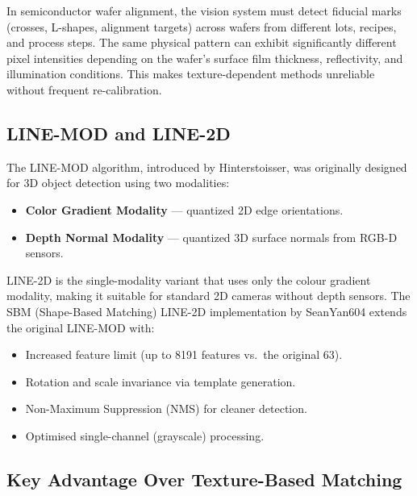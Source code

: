 \documentclass[12pt,a4paper]{article}
\begin{document}
In semiconductor wafer alignment, the vision system must detect fiducial marks
(crosses, L-shapes, alignment targets) across wafers from different lots, recipes,
and process steps.  The same physical pattern can exhibit significantly different
pixel intensities depending on the wafer's surface film thickness, reflectivity, and
illumination conditions.  This makes texture-dependent methods unreliable without
frequent re-calibration.

\subsection{LINE-MOD and LINE-2D}
The LINE-MOD algorithm, introduced by Hinterstoisser, was originally designed for 3D
object detection using two modalities:
\begin{itemize}
  \item \textbf{Color Gradient Modality} --- quantized 2D edge orientations.
  \item \textbf{Depth Normal Modality} --- quantized 3D surface normals from RGB-D
        sensors.
\end{itemize}

LINE-2D is the single-modality variant that uses only the colour gradient modality,
making it suitable for standard 2D cameras without depth sensors.  The SBM
(Shape-Based Matching) LINE-2D implementation by SeanYan604 extends the original
LINE-MOD with:
\begin{itemize}
  \item Increased feature limit (up to 8191 features vs.\ the original 63).
  \item Rotation and scale invariance via template generation.
  \item Non-Maximum Suppression (NMS) for cleaner detection.
  \item Optimised single-channel (grayscale) processing.
\end{itemize}

\subsection{Key Advantage Over Texture-Based Matching}
\end{document}
